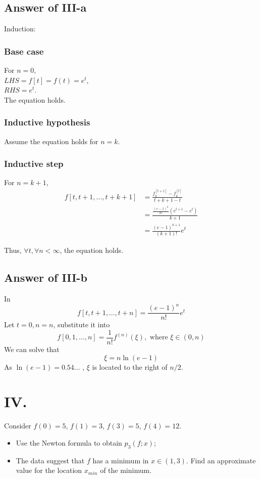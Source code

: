 \documentclass[a4paper]{article}
\begin{document}
\subsection*{Answer of III-a}

Induction:

\subsubsection*{Base case}
For $n=0$,\\
$LHS=f[t]=f(t)=e^t$,\\
$RHS=e^t$.\\
The equation holds.

\subsubsection*{Inductive hypothesis}
Assume the equation holds for $ n=k $.

\subsubsection*{Inductive step}
For $n=k+1$,
\begin{align*}
  f[t,t+1,\ldots,t+k+1]
  &=\frac{f_k^{[t+1]}-f_k^{[t]}}{t+k+1-t}\\
  &=\frac{\frac{(e-1)^k}{k!}(e^{t+1}-e^t)}{k+1}\\
  &=\frac{(e-1)^{k+1}}{(k+1)!}e^t
\end{align*}

Thus, $\forall t, \forall n < \infty$, the equation holds.

\subsection*{Answer of III-b}
In $$f[t,t+1,\ldots,t+n]=\frac{(e-1)^n}{n!}e^t$$
Let $t=0,n=n$,
substitute it into $$f[0,1,\ldots,n]=\frac{1}{n!}f^{(n)}(\xi), \text{ where } \xi \in (0,n)$$
We can solve that $$\xi=n\ln(e-1)$$
As $\ln(e-1)=0.54\ldots$ , $\xi$ is located to the right of $n/2$.

\section*{IV.}
Consider $f(0) = 5$, $f(1) = 3$, $f(3) = 5$, $f(4) = 12$.
\begin{itemize}
  \item Use the Newton formula to obtain $p_3(f; x)$;
  \item The data suggest that $f$ has a minimum in
  $x \in (1,3)$. Find an approximate value for the location $x_{min}$ of the minimum.
\end{itemize}
\end{document}
